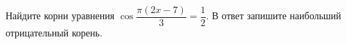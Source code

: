 \begin{ex}
	\begin{condition}
		Найдите корни уравнения \( \cos\dfrac{\pi(2x-7)}{3}=\dfrac{1}{2} \). В ответ запишите наибольший отрицательный корень.
	\end{condition}
	\answer{\(  \)}
\end{ex}